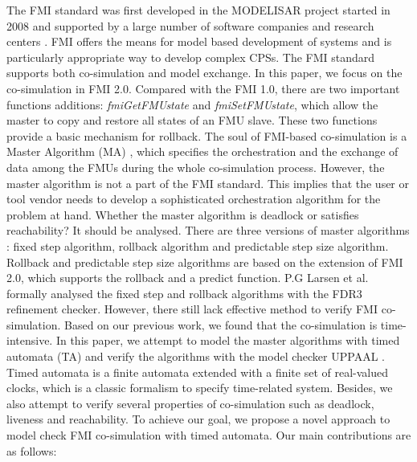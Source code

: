 The FMI standard was first developed in the MODELISAR project started in 2008 and supported by a large number of software companies and research centers \cite{ClauMODELISAR}. FMI offers the means for model based development of systems and is particularly appropriate way to develop complex CPSs. The FMI standard supports both co-simulation and  model exchange. In this paper, we focus on the co-simulation in FMI 2.0. Compared with the FMI 1.0, there are two important functions additions: \emph{fmiGetFMUstate} and \emph{fmiSetFMUstate}, which allow the master to copy and restore all states of an FMU slave. These two functions provide a basic mechanism for rollback. The soul of FMI-based co-simulation is a Master Algorithm (MA) \cite{AckerDVM15}, which specifies the orchestration and the exchange of data among the FMUs during the whole co-simulation process. However, the master algorithm is not a part of the FMI standard. This implies that the user or tool vendor needs to develop a sophisticated orchestration algorithm for the problem at hand. Whether the master algorithm is deadlock or satisfies reachability? It should be analysed. There are three versions of master algorithms \cite{BromanBGLMTW13}: fixed step algorithm, rollback algorithm and predictable step size algorithm. Rollback and predictable step size algorithms are based on the extension of FMI 2.0, which supports the rollback and a predict function. P.G Larsen et al. \cite{Larsen2016Integrated} formally analysed the fixed step and rollback algorithms with the FDR3 refinement checker. However, there still lack  
effective method to verify FMI co-simulation. Based on our previous work, we found that the co-simulation is time-intensive. In this paper, we attempt to model the master algorithms with timed automata (TA) and verify the algorithms with the model checker UPPAAL \cite{BehrmannDLHPYH06}. Timed automata is a finite automata extended with a finite set of real-valued clocks, which is a classic formalism to specify time-related system. Besides, we also attempt to verify several properties of co-simulation such as deadlock, liveness and reachability. To achieve our goal, we propose a novel approach to model check FMI co-simulation with timed automata.
Our main contributions are as follows:
